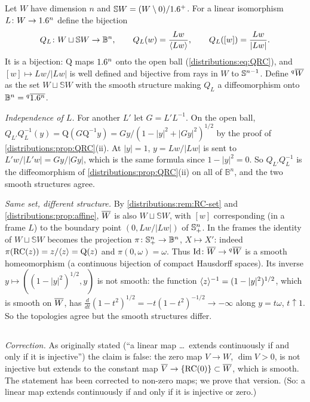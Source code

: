 \subsection*{}
Let $W$ have dimension $n$ and $\mathbb{S}W=(W\setminus0)/1.6^+$. For a linear isomorphism
$L\colon W\to1.6^n$ define the bijection
\[
  Q_L\colon W\sqcup\mathbb{S}W\to\mathbb{B}^n,\qquad
  Q_L(w)=\frac{Lw}{\langle Lw\rangle},\qquad Q_L([w])=\frac{Lw}{|Lw|}.
\]
It is a bijection: $\mathrm{Q}$ maps $1.6^n$ onto the open ball
(\eqref{distributions:eq:QRC}), and $[w]\mapsto Lw/|Lw|$ is well defined and bijective
from rays in $W$ to $\mathbb{S}^{n-1}$. Define ${}^{q}\overline{W}$ as the set $W\sqcup\mathbb{S}W$ with the
smooth structure making $Q_L$ a diffeomorphism onto $\mathbb{B}^n={}^{q}\overline{1.6^n}$.

\emph{Independence of $L$.} For another $L'$ let $G=L'L^{-1}$. On the open ball,
$Q_{L'}Q_L^{-1}(y)=\mathrm{Q}(G\mathrm{Q}^{-1}y)=Gy/(1-|y|^2+|Gy|^2)^{1/2}$ by the
proof of \cref{distributions:prop:QRC}(ii). At $|y|=1$, $y=Lw/|Lw|$ is sent to
$L'w/|L'w|=Gy/|Gy|$, which is the same formula since $1-|y|^2=0$. So
$Q_{L'}Q_L^{-1}$ is the diffeomorphism of \cref{distributions:prop:QRC}(ii) on all of
$\mathbb{B}^n$, and the two smooth structures agree.

\emph{Same set, different structure.} By \cref{distributions:rem:RC-set} and
\cref{distributions:prop:affine}, $\overline{W}$ is also $W\sqcup\mathbb{S}W$, with $[w]$
corresponding (in a frame $L$) to the boundary point $(0,Lw/|Lw|)$ of $\mathbb{S}^n_+$. In
the frames the identity of $W\sqcup\mathbb{S}W$ becomes the projection
$\pi\colon\mathbb{S}^n_+\to\mathbb{B}^n$, $X\mapsto X'$: indeed
$\pi(\mathrm{RC}(z))=z/\langle z\rangle=\mathrm{Q}(z)$ and $\pi(0,\omega)=\omega$. Thus
$\operatorname{Id}\colon\overline{W}\to{}^{q}\overline{W}$ is a smooth homeomorphism (a continuous bijection of compact
Hausdorff spaces). Its inverse $y\mapsto((1-|y|^2)^{1/2},y)$ is not smooth: the function
$\langle z\rangle^{-1}=(1-|y|^2)^{1/2}$, which is smooth on $\overline{W}$, has
$\frac{d}{dt}(1-t^2)^{1/2}=-t(1-t^2)^{-1/2}\to-\infty$ along $y=t\omega$, $t\uparrow1$.
So the topologies agree but the smooth structures differ.

\subsection*{}
\emph{Correction.} As originally stated (``a linear map \dots\ extends continuously if
and only if it is injective'') the claim is false: the zero map $V\to W$, $\dim V>0$, is
not injective but extends to the constant map $\overline{V}\to\{\mathrm{RC}(0)\}\subset\overline{W}$,
which is smooth. The statement has been corrected to non-zero maps; we prove that
version. (So: a linear map extends continuously if and only if it is injective or zero.)

